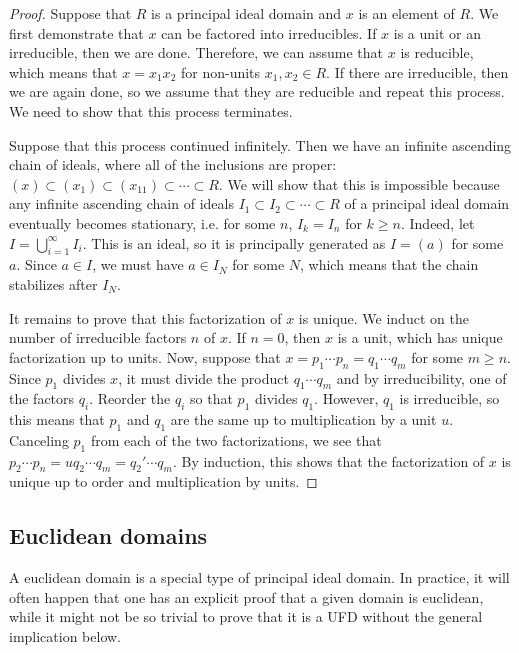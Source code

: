 \begin{proof} 
Suppose that $R$ is a principal ideal domain and $x$ is an element of $R$. We
first demonstrate that $x$ can be factored into irreducibles.
If $x$ is a unit or an irreducible, then we are done. Therefore, we can assume
that $x$ is reducible, which means that $x = x_1 x_2$ for non-units 
$x_1, x_2 \in R$. If there are irreducible, then we are again done, so we
assume that they are reducible and repeat this process. We need to show that
this process terminates.

Suppose that this process continued infinitely. Then we have an infinite
ascending chain of ideals, where all of the inclusions are proper:
$(x) \subset (x_1) \subset (x_{11}) \subset \cdots \subset R$.
We will show that this is impossible because any infinite ascending chain of
ideals $I_1 \subset I_2 \subset \cdots \subset R$ of a principal ideal domain 
eventually becomes stationary, i.e. for some $n$, $I_k = I_n$ for $k \geq n$.
Indeed, let $I = \bigcup_{i=1}^\infty I_i$. This is an ideal, so it is 
principally generated as $I = (a)$ for some $a$. Since $a \in I$, we must have 
$a \in I_N$ for some $N$, which means that the chain stabilizes after $I_N$.

It remains to prove that this factorization of $x$ is unique. We induct on
the number of irreducible factors $n$ of $x$. If $n = 0$, then $x$ is a unit,
which has unique factorization up to units. Now, suppose that 
$x = p_1 \cdots p_n = q_1 \cdots q_m$ for some $m \ge n$. Since $p_1$ divides
$x$, it must divide the product $q_1 \cdots q_m$ and by irreducibility, one of
the factors $q_i$. Reorder the $q_i$ so that $p_1$ divides $q_1$. However,
$q_1$ is irreducible, so this means that $p_1$ and $q_1$ are the same up to
multiplication by a unit $u$. Canceling $p_1$ from each of the two
factorizations, we see that $p_2 \cdots p_n = u q_2 \cdots q_m = q_2' \cdots
q_m$. By induction, this shows that the factorization of $x$ is unique up to
order and multiplication by units.
\end{proof} 


\subsection{Euclidean domains}

A euclidean domain is a special type of principal ideal domain. In practice,
it will often happen that one has an explicit proof that a given domain is
euclidean, while it might not be so trivial to prove that it is a UFD without
the general implication below.

